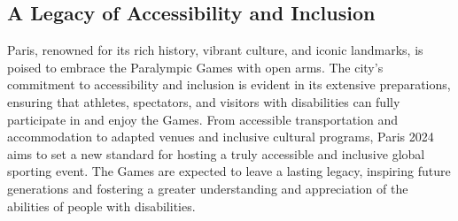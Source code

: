 \subsection{A Legacy of Accessibility and Inclusion}

Paris, renowned for its rich history, vibrant culture, and iconic landmarks, is poised to embrace the Paralympic Games with open arms. The city's commitment to accessibility and inclusion is evident in its extensive preparations, ensuring that athletes, spectators, and visitors with disabilities can fully participate in and enjoy the Games. From accessible transportation and accommodation to adapted venues and inclusive cultural programs, Paris 2024 aims to set a new standard for hosting a truly accessible and inclusive global sporting event. The Games are expected to leave a lasting legacy, inspiring future generations and fostering a greater understanding and appreciation of the abilities of people with disabilities.